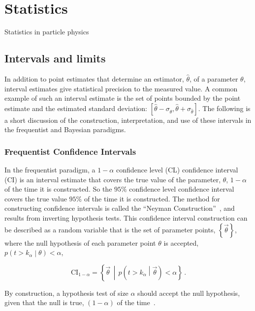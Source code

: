 \section{Statistics}\label{section:statistics}

Statistics in particle physics

\subsection{Intervals and limits}\label{section:intervals_and_limits}

In addition to point estimates that determine an estimator, $\hat{\theta}$, of a parameter $\theta$, interval estimates give statistical precision to the measured value.
A common example of such an interval estimate is the set of points bounded by the point estimate and the estimated standard deviation: $\left[\hat{\theta} - \sigma_{\hat{\theta}}, \hat{\theta} + \sigma_{\hat{\theta}}\right]$.
The following is a short discussion of the construction, interpretation, and use of these intervals in the frequentist and Bayesian paradigms.

\subsubsection{Frequentist Confidence Intervals}

In the frequentist paradigm, a $1-\alpha$ confidence level (CL) confidence interval (CI) is an interval estimate that covers the true value of the parameter, $\theta$, $1-\alpha$ of the time it is constructed.
So the $95\%$ confidence level confidence interval covers the true value $95\%$ of the time it is constructed.
The method for constructing confidence intervals is called the ``Neyman Construction''~\cite{Neyman:1937uhy}, and results from inverting hypothesis tests.
This confidence interval construction can be described as a random variable that is the set of parameter points, $\left\{\vec{\theta}\right\}$, where the null hypothesis of each parameter point $\theta$ is accepted, $p\left(t > k_{\alpha}\middle| \theta\right) < \alpha$,

\begin{equation}
 \mathrm{CI}_{1-\alpha} = \left\{\vec{\theta}\,\middle| \,p\left(t > k_{\alpha}\middle| \vec{\theta}\right) < \alpha\right\}\,.
 \label{eq:confidence_interval}
\end{equation}

By construction, a hypothesis test of size $\alpha$ should accept the null hypothesis, given that the null is true, $(1-\alpha)$ of the time~\cite{Cranmer:2015nia}.

